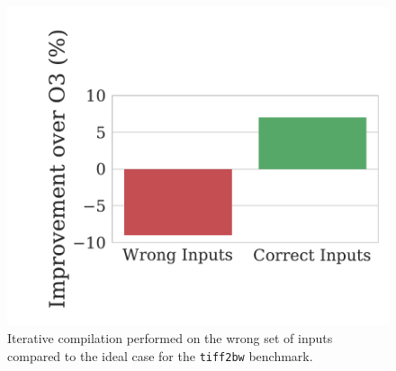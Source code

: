 \begin{figure}[t]
    \centering
    \includegraphics[width=0.7\linewidth]{figs/motivation_wrong_inputs.pdf}
    \caption{Iterative compilation performed on the wrong set of inputs compared to the ideal case for the \texttt{tiff2bw} benchmark.}
    \label{fig:motivation_wrong_inputs}
\end{figure}


